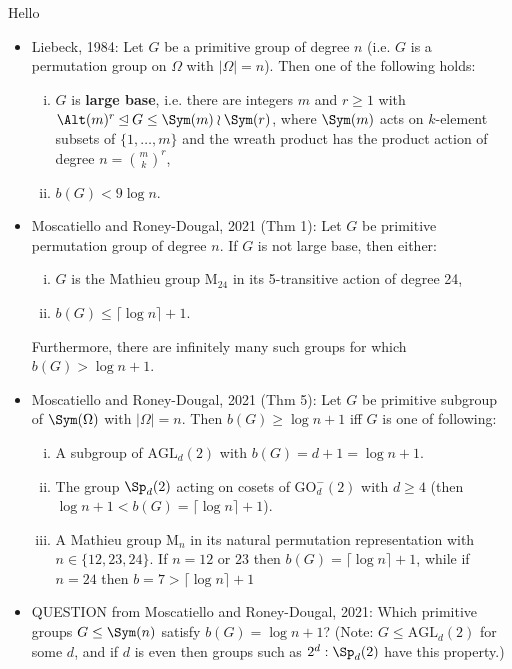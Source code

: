 Hello

\begin{itemize}
    \item Liebeck, 1984: Let $G$ be a primitive group of degree $n$ (i.e. $G$ is a permutation group on $\Omega$ with $|\Omega| = n$). Then one of the following holds:
          \begin{enumerate}[(i)]
              \item $G$ is \textbf{large base}, i.e. there are integers $m$ and $r \geq 1$ with $\Alt(m)^r \unlhd G \leq \Sym(m) \wr \Sym(r)$, where $\Sym(m)$ acts on $k$-element subsets of $\{1,\dotsc,m\}$ and the wreath product has the product action of degree $n = \binom{m}{k}^r$,
              \item $b(G) < 9\log n$.
          \end{enumerate}
    \item Moscatiello and Roney-Dougal, 2021 (Thm 1): Let $G$ be primitive permutation group of degree $n$. If $G$ is not large base, then either:
          \begin{enumerate}[(i)]
              \item $G$ is the Mathieu group $\mathrm{M}_{24}$ in its 5-transitive action of degree 24,
              \item $b(G) \leq \lceil\log n\rceil + 1$.
          \end{enumerate}
          Furthermore, there are infinitely many such groups for which $b(G) > \log n + 1$.
    \item Moscatiello and Roney-Dougal, 2021 (Thm 5): Let $G$ be primitive subgroup of $\Sym(\Omega)$ with $|\Omega| = n$. Then $b(G) \geq \log n + 1$ iff $G$ is one of following:
          \begin{enumerate}[(i)]
              \item A subgroup of $\mathrm{AGL}_d(2)$ with $b(G) = d + 1 = \log n + 1$.
              \item The group $\Sp_d(2)$ acting on cosets of $\mathrm{GO}^-_d(2)$ with $d \geq 4$ (then $\log n + 1 < b(G) = \lceil\log n\rceil + 1$).
              \item A Mathieu group $\mathrm{M}_n$ in its natural permutation representation with $n \in \{12,23,24\}$. If $n = 12$ or $23$ then $b(G) = \lceil\log n\rceil + 1$, while if $n = 24$ then $b = 7 > \lceil\log n\rceil + 1$
          \end{enumerate}
    \item QUESTION from Moscatiello and Roney-Dougal, 2021: Which primitive groups $G \leq \Sym(n)$ satisfy $b(G) = \log n + 1$? (Note: $G \leq \mathrm{AGL}_d(2)$ for some $d$, and if $d$ is even then groups such as $2^d : \Sp_d(2)$ have this property.)
\end{itemize}

